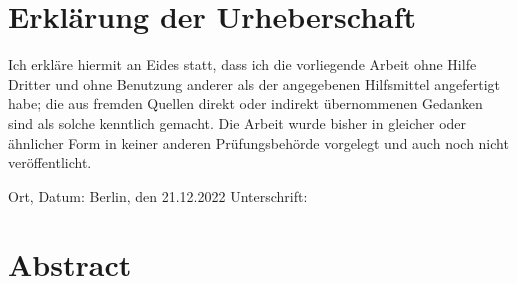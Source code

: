 \chapter*{Erkl{\"a}rung der Urheberschaft}
Ich erkläre hiermit an Eides statt, dass ich die vorliegende Arbeit ohne Hilfe Dritter und ohne Benutzung anderer als der angegebenen Hilfsmittel angefertigt habe; die aus fremden Quellen direkt oder indirekt übernommenen Gedanken sind als solche kenntlich gemacht. Die Arbeit wurde bisher in gleicher oder ähnlicher Form in keiner anderen Prüfungsbehörde vorgelegt und auch noch nicht veröffentlicht.


\vspace{4cm}

Ort, Datum:\hspace{0.25cm} Berlin, den 21.12.2022 \hfill Unterschrift: \hspace{1cm}

\newpage
\chapter*{Abstract}

